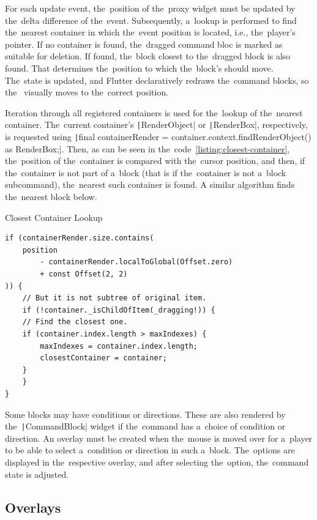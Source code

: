 For each update event, the~position of the~proxy widget must be updated by the~delta difference of the~event.
Subsequently, a~lookup is performed to find the~nearest container in which the~event position is located, i.e., the~player's pointer.
If no container is found, the~dragged command bloc is marked as suitable for deletion.
If found, the~block closest to the~dragged block is also found.
That determines the~position to which the~block's  should move.
The~state is updated, and Flutter declaratively redraws the~command blocks, so the~ visually moves to the~correct position.

Iteration through all registered containers is used for the~lookup of the~nearest container.
The~current container's \texttt|RenderObject| or \texttt|RenderBox|, respectively, is requested using \texttt|final containerRender = container.context.findRenderObject() as RenderBox;|.
Then, as can be seen in the~code~\ref{listing:closest-container}, the~position of the~container is compared with the~cursor position, and then, if the~container is not part of a~block (that is if the~container is not a~block subcommand), the~nearest such container is found.
A similar algorithm finds the~nearest block below.

\begin{listing}
    \caption{Closest Container Lookup}
    \label{listing:closest-container}
    \begin{verbatim}
if (containerRender.size.contains(
    position 
        - containerRender.localToGlobal(Offset.zero) 
        + const Offset(2, 2)
)) {
    // But it is not subtree of original item.
    if (!container._isChildOfItem(_dragging!)) {
    // Find the closest one.
    if (container.index.length > maxIndexes) {
        maxIndexes = container.index.length;
        closestContainer = container;
    }
    }
}
    \end{verbatim}
\end{listing}

Some blocks may have conditions or directions.
These are also rendered by the~\texttt|CommandBlock| widget if the~command has a~choice of condition or direction.
An overlay must be created when the~mouse is moved over for a~player to be able to select a~condition or direction in such a~block.
The~options are displayed in the~respective overlay, and after selecting the~option, the~command state is adjusted.

\subsection{Overlays}

